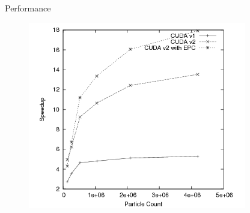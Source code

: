 \documentclass{beamer}
\begin{document}

\begin{frame}{Performance}

\begin{figure}
\centering
\includegraphics[width=0.85\textwidth]{data/timing_results_speedup.png}
\label{final_timing2}
\end{figure}

\end{frame}

\end{document}
